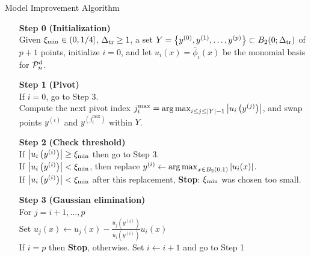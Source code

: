 \documentclass{article}
\begin{document}
{
\begin{fullwidth}[leftmargin=0in, rightmargin=0in, width=\linewidth-0.5in]
\begin{flushleft}

\begin{algorithm}[H]
    \caption{Model Improvement Algorithm \label{alg:model_improvement} }
    \label{model_improving_algorithm}
    \begin{itemize}
        \item[\textbf{Step 0}] \textbf{(Initialization)} \\
            Given $\xi_{\text{min}} \in (0,1/4]$, $\Delta_{\textrm{tr}} \ge 1$, a set $Y = \left\{y^{(0)}, y^{(1)}, \ldots, y^{(p)}\right\} \subset B_2(0;\Delta_{\textrm{tr}})$ of $p+1$ points,
            initialize $i=0$, and let $u_i(x)= \bar \phi_i(x)$ be the monomial basis for $\mathcal{P}^d_n$.
		\item[\textbf{Step 1}] \textbf{(Pivot)} \\
			If $i = 0$, go to Step 3. \\
			Compute the next pivot index $j^{\textrm{max}}_i = \operatorname*{arg\,max}_{i \le j \le |Y|-1} \left|u_i\left(y^{(j)}\right)\right|$,
			and swap points $y^{(i)}$ and $y^{(j^{\textrm{max}}_i)}$ within $Y$.
			
        \item[\textbf{Step 2}] \textbf{(Check threshold)} \\
                If $\left|u_i\left(y^{(i)}\right)\right| \ge \xi_{\text{min}}$ then go to Step 3. \\
                If $\left|u_i\left(y^{(i)}\right)\right| < \xi_{\text{min}}$, then replace $y^{(i)} \gets \operatorname*{arg\,max}_{x \in B_2\left(0; 1 \right)}\left|u_i(x)\right|$. \\
				If $\left|u_i\left(y^{(i)}\right)\right| < \xi_{\text{min}}$ after this replacement,  \textbf{Stop}: $\xi_{\text{min}}$ was chosen too small.
        \item[\textbf{Step 3}] \textbf{(Gaussian elimination)} \\
        	For $j = i+1, \ldots, p$ \\
        	\hspace{2em} Set $u_j(x) \gets u_j(x) - \frac{u_j\left(y^{(i)}\right)}{u_i\left(y^{(i)}\right)} u_i(x)$ \\
            If $i = p$ then \textbf{Stop}, otherwise.  Set $i \gets i+1$ and go to Step 1
    \end{itemize}
\end{algorithm}

\end{flushleft}
\end{fullwidth}
}
\end{document}
